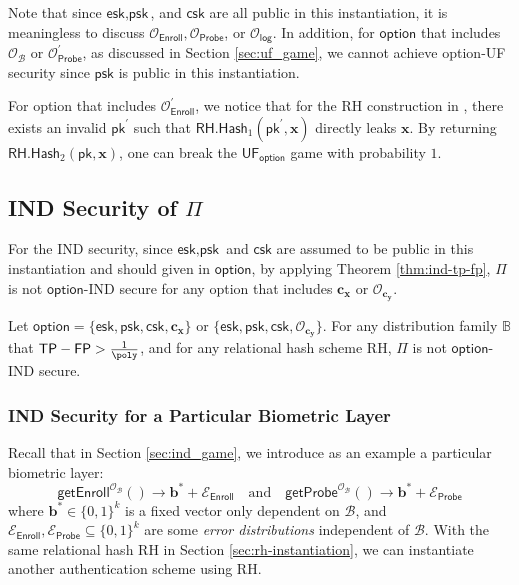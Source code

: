 Note that since $\textsf{esk}, \textsf{psk}$, and $ \textsf{csk}$ are all public in this instantiation, it is meaningless to discuss $\mathcal{O}_\textsf{Enroll}, \mathcal{O}_\textsf{Probe}$, or $\mathcal{O}_\textsf{log}$. In addition, for $\textsf{option}$ that includes $\mathcal{O}_\mathcal{B}$ or $\mathcal{O}_\textsf{Probe}^\prime$, as discussed in Section \ref{sec:uf_game}, we cannot achieve \textsf{option}-UF security since $\textsf{psk}$ is public in this instantiation.

For \textsf{option} that includes $\mathcal{O}_\textsf{Enroll}^\prime$, we notice that for the \textsf{RH} construction in \cite{cryptoeprint:2014/394}, there exists an invalid $\textsf{pk}^\prime$ such that $\textsf{RH.Hash}_1(\textsf{pk}^\prime, \mathbf{x})$ directly leaks $\mathbf{x}$. By returning $\textsf{RH.Hash}_2( \textsf{pk}, \mathbf{x} )$, one can break the $\textsf{UF}_{\textsf{option}}$ game with probability $1$.



\subsection{IND Security of $\Pi$}
\label{sec:security_analysis:rh:IND}

For the IND security, since $\textsf{esk}, \textsf{psk}$ and $\textsf{csk}$ are assumed to be public in this instantiation and should given in $\textsf{option}$, by applying Theorem \ref{thm:ind-tp-fp}, $\Pi$ is not $\textsf{option}$-IND secure for any \textsf{option} that includes $\mathbf{c_x}$ or $\mathcal{O}_{\mathbf{c_y}}$.

\begin{theorem}

Let $\textsf{option} = \{\textsf{esk}, \textsf{psk}, \textsf{csk}, \mathbf{c_x}\}$ or $\{\textsf{esk}, \textsf{psk}, \textsf{csk}, \mathcal{O}_{\mathbf{c_y}} \}$. For any distribution family $\mathbb{B}$ that $\textsf{TP} - \textsf{FP} > \frac{1}{\poly}$, and for any relational hash scheme \textsf{RH}, $\Pi$ is not $\textsf{option}$-IND secure.

\end{theorem}

\subsubsection{IND Security for a Particular Biometric Layer}

Recall that in Section \ref{sec:ind_game}, we introduce as an example a particular biometric layer:
\[
	\textsf{getEnroll}^{\mathcal{O}_{\mathcal{B}}}() \to \mathbf{b}^* + \mathcal{E}_{\textsf{Enroll}}  \quad \text{and} \quad \textsf{getProbe}^{\mathcal{O}_{\mathcal{B}}}() \to \mathbf{b}^* + \mathcal{E}_{\textsf{Probe}}
\]
where $\mathbf{b}^* \in \{0, 1\}^k$ is a fixed vector only dependent on $\mathcal{B}$, and $\mathcal{E}_{\textsf{Enroll}}, \mathcal{E}_{\textsf{Probe}} \subseteq \{0, 1\}^k$ are some \emph{error distributions} independent of $\mathcal{B}$.
With the same relational hash \textsf{RH} in Section \ref{sec:rh-instantiation}, we can instantiate another authentication scheme using \textsf{RH}.

